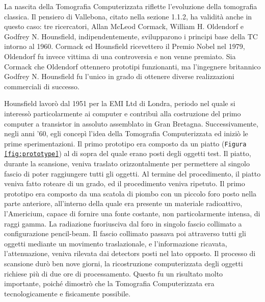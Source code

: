 \documentclass[a4paper,11pt, oneside]{article}
\begin{document}
                        La nascita della Tomografia Computerizzata riflette l'evoluzione della tomografia classica. Il pensiero di Vallebona, citato nella sezione 1.1.2, ha validità anche in questo caso: tre ricercatori, Allan McLeod Cormack, William H. Oldendorf e Godfrey N. Hounsfield, indipendentemente, svilupparono i principi base della TC intorno al 1960. Cormack ed Hounsfield ricevettero il Premio Nobel nel 1979, Oldendorf fu invece vittima di una controversia\cite{nobel-debate} e non venne premiato. 
                        Sia Cormack che Oldendorf ottennero prototipi funzionanti, ma l'ingegnere britannico Godfrey N. Hounsfield fu l'unico in grado di ottenere diverse realizzazioni commerciali di successo.
                    \par
                        Hounsfield lavorò dal 1951 per la EMI Ltd di Londra, periodo nel quale si interessò particolarmente ai computer e contribuì alla costruzione del primo computer a transistor in assoluto assemblato in Gran Bretagna\cite{housfield-autobiografia}. Successivamente, negli anni '60, egli concepì l’idea della Tomografia Computerizzata ed iniziò le prime sperimentazioni.
                        Il primo prototipo era composto da un piatto (\texttt{Figura \ref{fig:prototype}}) al di sopra del quale erano posti degli oggetti test. Il piatto, durante la scansione, veniva traslato orizzontalmente per permettere al singolo fascio di poter raggiungere tutti gli oggetti. Al termine del procedimento, il piatto veniva fatto roteare di un grado, ed il procedimento veniva ripetuto.
                        Il primo prototipo era composto da una scatola di piombo con un piccolo foro posto nella parte anteriore, all’interno della quale era presente un materiale radioattivo, l’Americium, capace di fornire una fonte costante, non particolarmente intensa, di raggi gamma. La radiazione fuoriusciva dal foro in singolo fascio collimato a configurazione pencil-beam. Il fascio collimato passava poi attraverso tutti gli oggetti mediante un movimento traslazionale, e l’informazione ricavata, l’attenuazione, veniva rilevata dai detectors posti nel lato opposto. Il processo di scansione durò ben nove giorni, la ricostruzione computerizzata degli oggetti richiese più di due ore di processamento. Questo fu un risultato molto importante, poiché dimostrò che la Tomografia Computerizzata era tecnologicamente e fisicamente possibile.
                        
\end{document}
